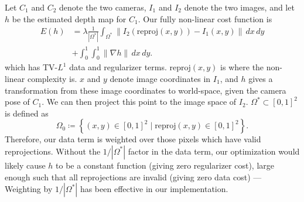 \documentclass[conference]{IEEEtran}
\begin{document}
Let $C_1$ and $C_2$ denote the two cameras, $I_1$ and $I_2$ denote the two images, and let $h$ be the estimated depth map for $C_1$.
Our fully non-linear cost function is
\begin{equation}
\begin{split}
E(h) &= \lambda \frac{1}{|\Omega^*|}\int_{\Omega^*}\left\|I_2(\text{reproj}(x,y)) - I_1(x,y)\right\|\,dx\,dy \\
     &+ \int_0^1\int_0^1\|\nabla h\| \,dx\,dy.
\end{split}
\end{equation}
which has TV-$L^1$ \cite{tv_optical_flow} data and regularizer terms. $\text{reproj}(x,y)$ is where the non-linear complexity is.
$x$ and $y$ denote image coordinates in $I_1$, and $h$ gives a transformation from these image coordinates to world-space,
given the camera pose of $C_1$. We can then project this point to the image space of $I_2$. $\Omega^* \subset [0,1]^2$
is defined as
\begin{equation}
    \Omega_0 \coloneqq \left\{(x,y) \in [0,1]^2 \mid \text{reproj}(x,y) \in [0,1]^2\right\}.
\end{equation}
Therefore, our data term is weighted over those pixels which have valid reprojections. Without the $1/|\Omega^*|$ factor
in the data term, our optimization would likely cause $h$ to be a constant function (giving zero regularizer cost), large enough such that
all reprojections are invalid (giving zero data cost) --- Weighting by $1/|\Omega^*|$ has been effective in our implementation.
\end{document}
